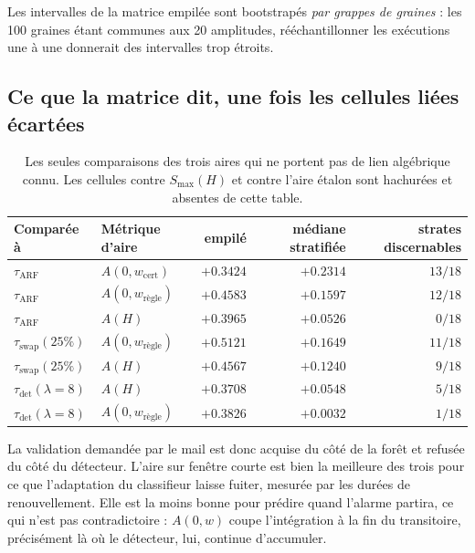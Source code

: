 \documentclass[11pt,a4paper]{article}
\begin{document}
Les intervalles de la matrice empilée sont bootstrapés \emph{par grappes de graines} : les 100
graines étant communes aux 20 amplitudes, rééchantillonner les exécutions une à une donnerait
des intervalles trop étroits.

\subsection{Ce que la matrice dit, une fois les cellules liées écartées}

\begin{table}[htbp]
  \centering
  \begin{tabular}{llrrr}
    \toprule
    Comparée à & Métrique d'aire & empilé & médiane stratifiée & strates discernables \\
    \midrule
    $\tau_{\mathrm{ARF}}$ & $A(0,w_{\mathrm{cert}})$  & $+0.3424$ & $+0.2314$ & $13/18$ \\
    $\tau_{\mathrm{ARF}}$ & $A(0,w_{\text{règle}})$   & $+0.4583$ & $+0.1597$ & $12/18$ \\
    $\tau_{\mathrm{ARF}}$ & $A(H)$                    & $+0.3965$ & $+0.0526$ & $0/18$  \\
    \midrule
    $\tau_{\mathrm{swap}}(25\%)$ & $A(0,w_{\text{règle}})$ & $+0.5121$ & $+0.1649$ & $11/18$ \\
    $\tau_{\mathrm{swap}}(25\%)$ & $A(H)$                  & $+0.4567$ & $+0.1240$ & $9/18$  \\
    \midrule
    $\tau_{\mathrm{det}}(\lambda = 8)$ & $A(H)$                  & $+0.3708$ & $+0.0548$ & $5/18$ \\
    $\tau_{\mathrm{det}}(\lambda = 8)$ & $A(0,w_{\text{règle}})$ & $+0.3826$ & $+0.0032$ & $1/18$ \\
    \bottomrule
  \end{tabular}
  \caption{Les seules comparaisons des trois aires qui ne portent pas de lien algébrique
  connu. Les cellules contre $S_{\max}(H)$ et contre l'aire étalon sont hachurées et absentes
  de cette table.}
\end{table}

La validation demandée par le mail est donc acquise du côté de la forêt et refusée du côté du
détecteur. L'aire sur fenêtre courte est bien la meilleure des trois pour ce que
l'adaptation du classifieur laisse fuiter, mesurée par les durées de renouvellement. Elle est
la moins bonne pour prédire quand l'alarme partira, ce qui n'est pas contradictoire :
$A(0,w)$ coupe l'intégration à la fin du transitoire, précisément là où le détecteur, lui,
continue d'accumuler.
\end{document}
